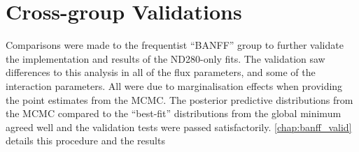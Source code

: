 \section{Cross-group Validations}
Comparisons were made to the frequentist ``BANFF'' group to further validate the implementation and results of the ND280-only fits. The validation saw differences to this analysis in all of the flux parameters, and some of the interaction parameters. All were due to marginalisation effects when providing the point estimates from the MCMC. The posterior predictive distributions from the MCMC compared to the ``best-fit'' distributions from the global minimum agreed well and the validation tests were passed satisfactorily. \autoref{chap:banff_valid} details this procedure and the results
